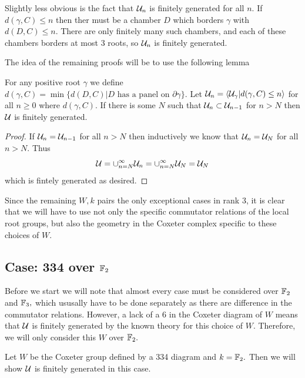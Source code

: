 \documentclass[class=book, crop=false]{standalone}
\begin{document}
Slightly less obvious is the fact that $\mathcal{U}_n$ is finitely generated for all $n.$ If $d(\gamma,C)\le n$ then ther must be a chamber $D$ which borders $\gamma$ with $d(D,C)\le n.$ There are only finitely many such chambers, and each of these chambers borders at most 3 roots, so $\mathcal{U}_n$ is finitely generated.

The idea of the remaining proofs will be to use the following lemma
\begin{lemma} 
	For any positive root $\gamma$ we define $d(\gamma,C)=\min\{d(D,C)|D\text{ has a panel on }\partial \gamma\}.$ Let $\mathcal{U}_n=\langle \mathcal{U}_\gamma |d(\gamma,C)\le n\rangle$ for all $n\ge 0$ where $d(\gamma,C).$ If there is some $N$ such that $\mathcal{U}_n\subset \mathcal{U}_{n-1}$ for $n>N$ then $\mathcal{U}$ is finitely generated.
	\label{fgcond}
\end{lemma}
\begin{proof}
	If $\mathcal{U}_n=\mathcal{U}_{n-1}$ for all $n> N$ then inductively we know that $\mathcal{U}_n=\mathcal{U}_N$ for all $n>N.$ Thus
	\[
		\mathcal{U}=\cup_{n=N}^{\infty}{\mathcal{U}_n}=\cup_{n=N}^\infty \mathcal{U}_N=\mathcal{U}_N
	\]
	which is fintely generated as desired.
\end{proof}

Since the remaining $W,k$ pairs the only exceptional cases in rank 3, it is clear that we will have to use not only the specific commutator relations of the local root groups, but also the geometry in the Coxeter complex specific to these choices of $W.$

\subsection{Case: 334 over $\mathbb{F}_{2}$}
Before we start we will note that almost every case must be considered over $\mathbb{F}_{2}$ and $\mathbb{F}_{3},$ which ususally have to be done separately as there are difference in the commutator relations. However, a lack of a $6$ in the Coxeter diagram of $W$ means that $\mathcal{U}$ is finitely generated by the known theory for this choice of $W.$ Therefore, we will only consider this $W$ over $\mathbb{F}_{2}.$

Let $W$ be the Coxeter group defined by a 334 diagram and $k=\mathbb{F}_{2}.$ Then we will show $\mathcal{U}$ is finitely generated in this case.
\end{document}
